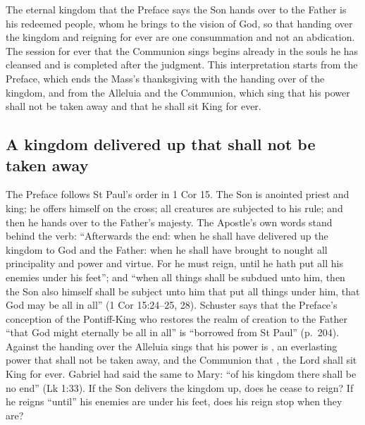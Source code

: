 
The eternal kingdom that the Preface says the Son hands over to the Father is
his redeemed people, whom he brings to the vision of God, so that handing over
the kingdom and reigning for ever are one consummation and not an abdication.
The session for ever that the Communion sings begins already in the souls he
has cleansed and is completed after the judgment. This interpretation starts
from the Preface, which ends the Mass's thanksgiving with the handing over of
the kingdom, and from the Alleluia and the Communion, which sing that his power
shall not be taken away and that he shall sit King for ever.

\subsection{A kingdom delivered up that shall not be taken away}
\label{sec:handed-question}

The Preface follows St Paul's order in 1 Cor 15. The Son is anointed priest
and king; he offers himself on the cross; all creatures are subjected to his
rule; and then he hands over  to the
Father's majesty. The Apostle's own words stand behind the verb: ``Afterwards
the end: when he shall have delivered up the kingdom to God and the Father:
when he shall have brought to nought all principality and power and virtue.
For he must reign, until he hath put all his enemies under his feet''; and
``when all things shall be subdued unto him, then the Son also himself shall
be subject unto him that put all things under him, that God may be all in
all'' (1 Cor 15:24--25, 28). Schuster says that the Preface's conception of
the Pontiff-King who restores the realm of creation to the Father ``that God
might eternally be all in all'' is ``borrowed from St Paul'' (p.~204). Against
the handing over the Alleluia sings that his power is
, an everlasting power that shall
not be taken away, and the Communion that , the Lord shall sit King for ever. Gabriel had said the same to
Mary: ``of his kingdom there shall be no end'' (Lk 1:33). If the Son delivers
the kingdom up, does he cease to reign? If he reigns ``until'' his enemies are
under his feet, does his reign stop when they are?

